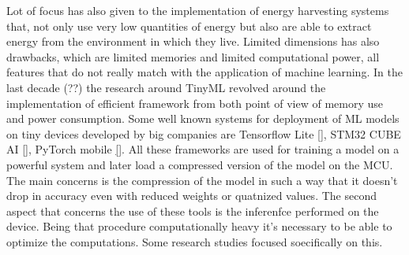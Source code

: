 \documentclass[12pt]{report}
\begin{document}
Lot of focus has also given to the implementation of energy harvesting systems that, not only use very low quantities of energy but also are able to extract energy from the environment in which they live. Limited dimensions has also drawbacks, which are limited memories and limited computational power, all features that do not really match with the application of machine learning. 
In the last decade (??) the research around TinyML revolved around the implementation of efficient framework from both point of view of memory use and power consumption. Some well known systems for deployment of ML models on tiny devices developed by big companies are Tensorflow Lite \ref{}, STM32 CUBE AI \ref{}, PyTorch mobile \ref{}. All these frameworks are used for training a model on a powerful system and later load a compressed version of the model on the MCU. The main concerns is the compression of the model in such a way that it doesn't drop in accuracy even with reduced weights or quatnized values. The second aspect that concerns the use of these tools is the inferenfce performed on the device. Being that procedure computationally heavy it's necessary to be able to optimize the computations. Some research studies focused soecifically on this.\\
\end{document}

